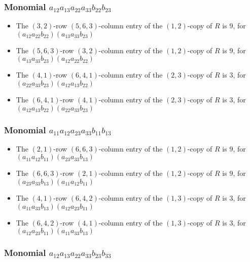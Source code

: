 \documentclass{article}
\begin{document}
\subsubsection{Monomial $ a_{12} a_{13} a_{22} a_{33} b_{22} b_{23} $}

\begin{itemize}
\item The $(3, 2)$-row $(5, 6, 3)$-column entry of the $ \left(1, 2\right) $-copy of $R$ is $ 9 $, for $( a_{12} a_{22} b_{22} )( a_{13} a_{33} b_{23} )$ 
\item The $(5, 6, 3)$-row $(3, 2)$-column entry of the $ \left(1, 2\right) $-copy of $R$ is $ 9 $, for $( a_{13} a_{33} b_{23} )( a_{12} a_{22} b_{22} )$ 
\item The $(4, 1)$-row $(6, 4, 1)$-column entry of the $ \left(2, 3\right) $-copy of $R$ is $ 3 $, for $( a_{22} a_{33} b_{23} )( a_{12} a_{13} b_{22} )$ 
\item The $(6, 4, 1)$-row $(4, 1)$-column entry of the $ \left(2, 3\right) $-copy of $R$ is $ 3 $, for $( a_{12} a_{13} b_{22} )( a_{22} a_{33} b_{23} )$ 
\end{itemize}
\subsubsection{Monomial $ a_{11} a_{12} a_{23} a_{33} b_{11} b_{13} $}

\begin{itemize}
\item The $(2, 1)$-row $(6, 6, 3)$-column entry of the $ \left(1, 2\right) $-copy of $R$ is $ 9 $, for $( a_{11} a_{12} b_{11} )( a_{23} a_{33} b_{13} )$ 
\item The $(6, 6, 3)$-row $(2, 1)$-column entry of the $ \left(1, 2\right) $-copy of $R$ is $ 9 $, for $( a_{23} a_{33} b_{13} )( a_{11} a_{12} b_{11} )$ 
\item The $(4, 1)$-row $(6, 4, 2)$-column entry of the $ \left(1, 3\right) $-copy of $R$ is $ 3 $, for $( a_{11} a_{33} b_{13} )( a_{12} a_{23} b_{11} )$ 
\item The $(6, 4, 2)$-row $(4, 1)$-column entry of the $ \left(1, 3\right) $-copy of $R$ is $ 3 $, for $( a_{12} a_{23} b_{11} )( a_{11} a_{33} b_{13} )$ 
\end{itemize}
\subsubsection{Monomial $ a_{12} a_{13} a_{22} a_{33} b_{23} b_{33} $}
\end{document}
